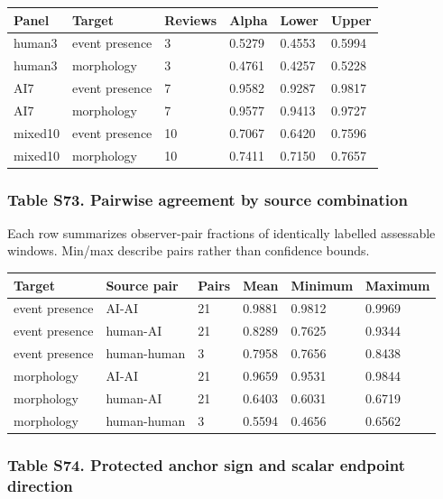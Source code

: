 \documentclass[a4paper,11pt]{article}
\newcounter{none}
\begin{document}
{\def\LTcaptype{none} %
\begin{longtable}[]{@{}llllll@{}}
\toprule\noalign{}
Panel & Target & Reviews & Alpha & Lower & Upper \\
\midrule\noalign{}
\endhead
\bottomrule\noalign{}
\endlastfoot
human3 & event presence & 3 & 0.5279 & 0.4553 & 0.5994 \\
human3 & morphology & 3 & 0.4761 & 0.4257 & 0.5228 \\
AI7 & event presence & 7 & 0.9582 & 0.9287 & 0.9817 \\
AI7 & morphology & 7 & 0.9577 & 0.9413 & 0.9727 \\
mixed10 & event presence & 10 & 0.7067 & 0.6420 & 0.7596 \\
mixed10 & morphology & 10 & 0.7411 & 0.7150 & 0.7657 \\
\end{longtable}
}

\subsubsection{Table S73. Pairwise agreement by source combination}\label{table-s73.-pairwise-agreement-by-source-combination}

Each row summarizes observer-pair fractions of identically labelled assessable windows. Min/max describe pairs rather than confidence bounds.

{\def\LTcaptype{none} %
\begin{longtable}[]{@{}llllll@{}}
\toprule\noalign{}
Target & Source pair & Pairs & Mean & Minimum & Maximum \\
\midrule\noalign{}
\endhead
\bottomrule\noalign{}
\endlastfoot
event presence & AI-AI & 21 & 0.9881 & 0.9812 & 0.9969 \\
event presence & human-AI & 21 & 0.8289 & 0.7625 & 0.9344 \\
event presence & human-human & 3 & 0.7958 & 0.7656 & 0.8438 \\
morphology & AI-AI & 21 & 0.9659 & 0.9531 & 0.9844 \\
morphology & human-AI & 21 & 0.6403 & 0.6031 & 0.6719 \\
morphology & human-human & 3 & 0.5594 & 0.4656 & 0.6562 \\
\end{longtable}
}

\subsubsection{Table S74. Protected anchor sign and scalar endpoint direction}\label{table-s74.-protected-anchor-sign-and-scalar-endpoint-direction}
\end{document}
